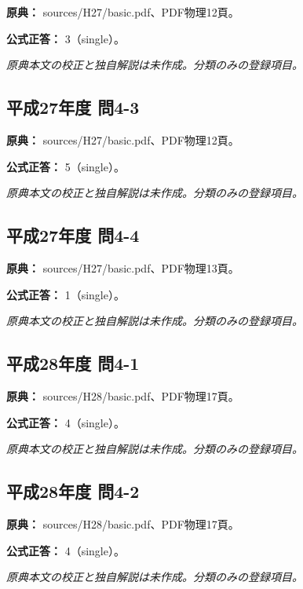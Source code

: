 \noindent\textbf{原典：} sources/H27/basic.pdf、PDF物理12頁。

\textbf{公式正答：} 3（single）。

\par\textit{原典本文の校正と独自解説は未作成。分類のみの登録項目。}

\subsection{平成27年度 問4-3}
\label{q:h27-reg-basic-4-3}

\noindent\textbf{原典：} sources/H27/basic.pdf、PDF物理12頁。

\textbf{公式正答：} 5（single）。

\par\textit{原典本文の校正と独自解説は未作成。分類のみの登録項目。}

\subsection{平成27年度 問4-4}
\label{q:h27-reg-basic-4-4}

\noindent\textbf{原典：} sources/H27/basic.pdf、PDF物理13頁。

\textbf{公式正答：} 1（single）。

\par\textit{原典本文の校正と独自解説は未作成。分類のみの登録項目。}

\subsection{平成28年度 問4-1}
\label{q:h28-reg-basic-4-1}

\noindent\textbf{原典：} sources/H28/basic.pdf、PDF物理17頁。

\textbf{公式正答：} 4（single）。

\par\textit{原典本文の校正と独自解説は未作成。分類のみの登録項目。}

\subsection{平成28年度 問4-2}
\label{q:h28-reg-basic-4-2}

\noindent\textbf{原典：} sources/H28/basic.pdf、PDF物理17頁。

\textbf{公式正答：} 4（single）。

\par\textit{原典本文の校正と独自解説は未作成。分類のみの登録項目。}

